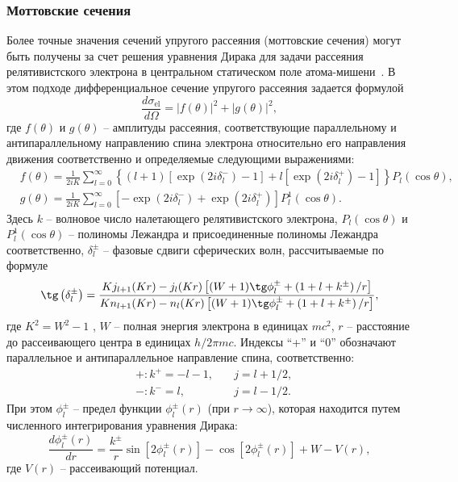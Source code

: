 \subsubsection{Моттовские сечения}
Более точные значения сечений упругого рассеяния (моттовские сечения) могут быть получены за счет решения уравнения Дирака для задачи рассеяния релятивистского электрона в центральном статическом поле атома-мишени~\cite{Czyzewski_mott_cs}. В этом подходе дифференциальное сечение упругого рассеяния задается формулой
\begin{equation}
	\frac{d \sigma_\mathrm{el}}{d \Omega}=|f(\theta)|^2+|g(\theta)|^2,
\end{equation}
где $f(\theta)$ и $g(\theta)$ -- амплитуды рассеяния, соответствующие параллельному и антипараллельному направлению спина электрона относительно его направления движения соответственно и определяемые следующими выражениями:
\begin{equation}
	\begin{aligned}
		&f(\theta)=\frac{1}{2 i K} \sum_{l=0}^{\infty}\left\{(l+1)\left[\exp \left(2 i \delta_l^{-}\right)-1\right]+l\left[\exp \left(2 i \delta_l^{+}\right)-1\right]\right\} P_l(\cos \theta), \\
		&g(\theta)=\frac{1}{2 i K} \sum_{l=0}^{\infty}\left[-\exp \left(2 i \delta_l^{-}\right)+\exp \left(2 i \delta_l^{+}\right)\right] P_l^1(\cos \theta).
	\end{aligned}
\end{equation}
Здесь $k$ -- волновое число налетающего релятивистского электрона, $P_l(\cos \theta)$ и $P_l^1 (\cos \theta)$ -- полиномы Лежандра и присоединенные полиномы Лежандра соответственно, $\delta_l^{\pm}$ -- фазовые сдвиги сферических волн, рассчитываемые по формуле
\begin{equation}
	\tg \left(\delta_l^{\pm}\right)=\frac{K j_{l+1}(K r)-j_l(K r)\left[(W+1) \tg \phi_l^{\pm}+\left(1+l+k^{\pm}\right) / r\right]}{K n_{l+1}(K r)-n_l(K r)\left[(W+1) \tg \phi_l^{\pm}+\left(1+l+k^{\pm}\right) / r\right]},
\end{equation}
где $K^2 = W^2 - 1$ , $W$ -- полная энергия электрона в единицах $mc^2$, $r$ -- расстояние до рассеивающего центра в единицах $h/2 \pi mc$. 
Индексы ``+'' и ``0'' обозначают параллельное и антипараллельное направление спина, соответственно:
\begin{equation}
	\begin{aligned}
		&+: k^{+}=-l-1, \quad & j=l+1 / 2, \\
		&-: k^{-}=l, \quad & j=l-1 / 2 .
	\end{aligned}
\end{equation}
При этом $\phi_l^\pm$ -- предел функции $\phi_l^\pm (r)$ (при $r \rightarrow \infty$), которая находится путем численного интегрирования уравнения Дирака:
\begin{equation}
	\frac{d \phi_l^{\pm}(r)}{d r}=\frac{k^{\pm}}{r} \sin \left[2 \phi_l^{\pm}(r)\right]-\cos \left[2 \phi_l^{\pm}(r)\right]+W-V(r),
\end{equation}
где $V(r)$ -- рассеивающий потенциал.


